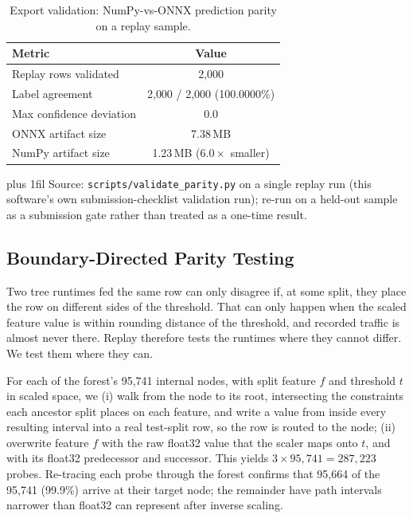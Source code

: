 \documentclass[runningheads]{llncs}
\newcommand{\tabnote}[1]{%
  \vspace{4pt}\par\noindent
  \begin{minipage}{\textwidth}%
    \footnotesize\parindent=0pt\leftskip=0pt\rightskip=0pt\parfillskip=0pt plus 1fil\relax
    #1%
  \end{minipage}}
\begin{document}
\begin{table}[htbp]
  \caption{Export validation: NumPy-vs-ONNX prediction parity on a replay sample.}
  \label{tab:parity}
  \centering
  \small
  \begin{tabular}{l c}
    \toprule
    Metric & Value \\
    \midrule
    Replay rows validated & 2{,}000 \\
    Label agreement & 2{,}000 / 2{,}000 (100.0000\%) \\
    Max confidence deviation & 0.0 \\
    ONNX artifact size & 7.38\,MB \\
    NumPy artifact size & 1.23\,MB ($6.0\times$ smaller) \\
    \bottomrule
  \end{tabular}
  \tabnote{Source: \texttt{scripts/validate\_parity.py} on a single replay run (this software's own submission-checklist validation run); re-run on a held-out sample as a submission gate rather than treated as a one-time result.}
\end{table}

\subsection{Boundary-Directed Parity Testing}
\label{sec:boundary}

Two tree runtimes fed the same row can only disagree if, at some split, they place the row on different sides of the threshold. That can only happen when the scaled feature value is within rounding distance of the threshold, and recorded traffic is almost never there. Replay therefore tests the runtimes where they cannot differ. We test them where they can.

For each of the forest's 95{,}741 internal nodes, with split feature $f$ and threshold $t$ in scaled space, we (i) walk from the node to its root, intersecting the constraints each ancestor split places on each feature, and write a value from inside every resulting interval into a real test-split row, so the row is routed to the node; (ii) overwrite feature $f$ with the raw float32 value that the scaler maps onto $t$, and with its float32 predecessor and successor. This yields $3 \times 95{,}741 = 287{,}223$ probes. Re-tracing each probe through the forest confirms that 95{,}664 of the 95{,}741 (99.9\%) arrive at their target node; the remainder have path intervals narrower than float32 can represent after inverse scaling.
\end{document}
